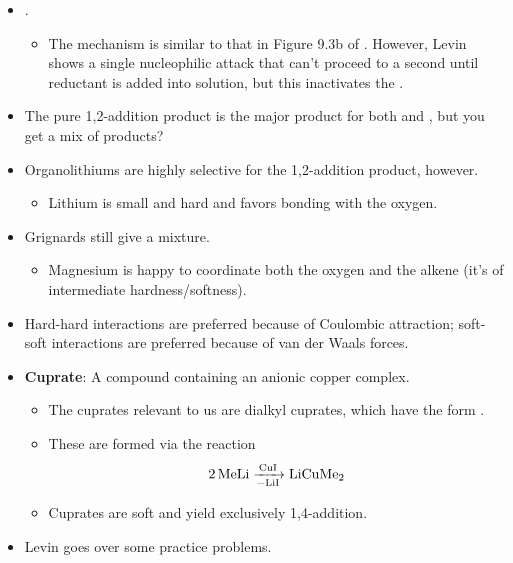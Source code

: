 \documentclass[../notes.tex]{subfiles}
\begin{document}
\begin{itemize}
\begin{itemize}
    \end{itemize}
    \item {}.
    \begin{itemize}
        \item The mechanism is similar to that in Figure 9.3b of \textcite{bib:CHEM22100Notes}. However, Levin shows a single nucleophilic attack that can't proceed to a second until reductant is added into solution, but this inactivates the .
    \end{itemize}
    \item The pure 1,2-addition product is the major product for both  and , but you get a mix of products?
    \item Organolithiums are highly selective for the 1,2-addition product, however.
    \begin{itemize}
        \item Lithium is small and hard and favors bonding with the oxygen.
    \end{itemize}
    \item Grignards still give a mixture.
    \begin{itemize}
        \item Magnesium is happy to coordinate both the oxygen and the alkene (it's of intermediate hardness/softness).
    \end{itemize}
    \item Hard-hard interactions are preferred because of Coulombic attraction; soft-soft interactions are preferred because of van der Waals forces.
    \item \textbf{Cuprate}: A compound containing an anionic copper complex.
    \begin{itemize}
        \item The cuprates relevant to us are dialkyl cuprates, which have the form .
        \item These are formed via the reaction
        \begin{equation*}
            \ce{2MeLi ->[CuI][-LiI] LiCuMe2}
        \end{equation*}
        \item Cuprates are soft and yield exclusively 1,4-addition.
    \end{itemize}
    \item Levin goes over some practice problems.
\end{itemize}
\end{document}
